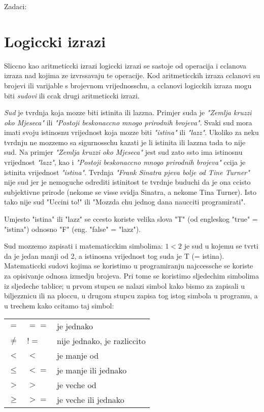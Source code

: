 Zadaci:

\section{Logiccki izrazi}

Sliccno kao aritmeticcki izrazi logiccki izrazi se sastoje od
operacija i cclanova izraza nad kojima ze izvrssavaju te operacije.
Kod aritmeticckih izraza cclanovi su brojevi ili varijable s
brojevnom vrijednosschu, a cclanovi logicckih izraza mogu biti
\emph{sudovi} ili ccak drugi aritmeticcki izrazi.

\emph{Sud} je tvrdnja koja mozze biti istinita ili lazzna. Primjer
suda je \emph{"Zemlja kruzzi oko Mjeseca"} ili \emph{"Postoji
beskonaccno mnogo prirodnih brojeva"}.  Svaki sud mora imati svoju
istinosnu vrijednost koja mozze biti \emph{"istina"} ili \emph{"lazz"}.
Ukoliko za neku tvrdnju ne mozzemo sa sigurnosschu kazati je li
istinita ili lazzna tada to nije sud. Na primjer \emph{"Zemlja
kruzzi oko Mjeseca"} jest sud zato ssto ima istinosnu vrijednost
\emph{"lazz"}, kao i \emph{"Postoji beskonaccno mnogo prirodnih
brojeva"} ccija je istinita vrijednost \emph{"istina"}.  Tvrdnja
\emph{"Frank Sinatra pjeva bolje od Tine Turner"} nije sud jer je
nemoguche odrediti istinitost te tvrdnje buduchi da je ona ccisto
subjektivne prirode (nekome se visse svidja Sinatra, a nekome Tina
Turner). Isto tako nije sud "Uccini to!" ili "Mozzda chu jednog
dana naucciti programirati".

Umjesto "istina" ili "lazz" se ccesto koriste velika slova "T" (od
engleskog "true" = "istina") odnosno "F" (eng. "false" = "lazz").

Sud mozzemo zapisati i matematicckim simbolima: $1<2$ je sud u
kojemu se tvrti da je jedan manji od 2, a istinosna vrijednost tog
suda je T (= istina). Matematiccki sudovi kojima se koristimo u
programiranju najccessche se koriste za opisivanje odnosa izmedju
brojeva. Pri tome se koristimo sljedechim simbolima iz sljedeche tablice;
u prvom stupcu se nalazi simbol kako bismo za zapisali u biljezznicu
ili na ploccu, u drugom stupcu zapisa tog istog simbola u programu,
a u trechem kako ccitamo taj simbol:

\begin{tabular}{lll}
	$=$ & $==$ & je jednako \\
	$\neq$ & $!=$ & nije jednako, je razliccito \\
	$<$ & $<$ & je manje od \\
	$\leq$ & $<=$ & je manje ili jednako \\
	$>$ & $>$ & je veche od \\
	$\geq$ & $>=$ & je veche ili jednako
\end{tabular}

